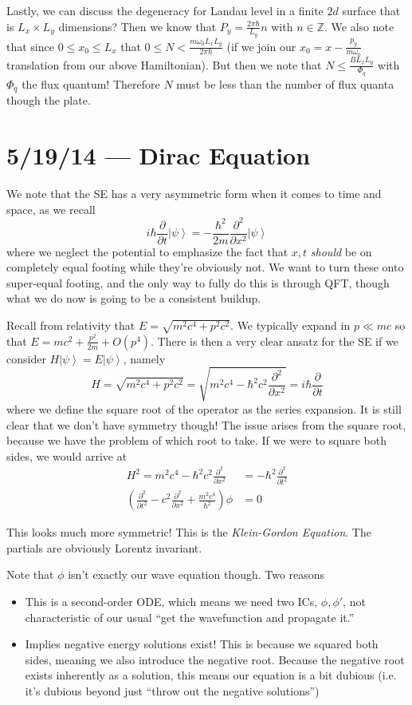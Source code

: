 \documentclass[10pt]{report}
\newcommand{\ket}[1]{\left|#1\right>}
\newcommand{\pd}[2]{\frac{\partial #1}{\partial#2}}
\newcommand{\ptd}[2]{\frac{\partial^2 #1}{\partial#2^2}}
\begin{document}
Lastly, we can discuss the degeneracy for Landau level in a finite $2d$ surface that is $L_x \times L_y$ dimensions? Then we know that $P_y= \frac{2\pi \hbar}{L_y}n$ with $n \in \mathbb{Z}$. We also note that since $0 \leq x_0 \leq L_x$ that $0 \leq N < \frac{m\omega_0 L_x L_y}{2\pi \hbar}$ (if we join our $x_0 = x - \frac{p_y}{m\omega_0}$ translation from our above Hamiltonian). But then we note that $N \leq \frac{BL_xL_y}{\Phi_{q}}$ with $\Phi_q$ the flux quantum! Therefore $N$ must be less than the number of flux quanta though the plate.
\chapter{5/19/14 --- Dirac Equation}

We note that the SE has a very asymmetric form when it comes to time and space, as we recall
\begin{equation}
    i\hbar \pd{}{t}\ket{\psi} = -\frac{\hbar^2}{2m} \ptd{}{x}\ket{\psi}
\end{equation}
where we neglect the potential to emphasize the fact that $x,t$ \emph{should} be on completely equal footing while they're obviously not. We want to turn these onto super-equal footing, and the only way to fully do this is through QFT, though what we do now is going to be a consistent buildup.

Recall from relativity that $E = \sqrt{m^2c^4 + p^2c^2}$. We typically expand in $p \ll mc$ so that $E = mc^2 + \frac{p^2}{2m} + O(p^4)$. There is then a very clear ansatz for the SE if we consider $H\ket{\psi} = E\ket{\psi}$, namely
\begin{equation}
    H = \sqrt{m^2c^4 + p^2c^2} = \sqrt{m^2c^4 - \hbar^2 c^2 \ptd{}{x}}= i\hbar \pd{}{t}
\end{equation}
where we define the square root of the operator as the series expansion. It is still clear that we don't have symmetry though! The issue arises from the square root, because we have the problem of which root to take. If we were to square both sides, we would arrive at
\begin{align}
    H^2 = m^2c^4 - \hbar^2c^2 \ptd{}{x} &= -\hbar^2 \ptd{}{t}\\
    \left(\ptd{}{t} - c^2\ptd{}{x} + \frac{m^2c^4}{\hbar^2}\right)\phi &= 0
\end{align}

This looks much more symmetric! This is the \emph{Klein-Gordon Equation}. The partials are obviously Lorentz invariant. 

Note that $\phi$ isn't exactly our wave equation though. Two reasons
\begin{itemize}
    \item This is a second-order ODE, which means we need two ICs, $\phi,\phi'$, not characteristic of our usual ``get the wavefunction and propagate it.''
    \item Implies negative energy solutions exist! This is because we squared both sides, meaning we also introduce the negative root. Because the negative root exists inherently as a solution, this means our equation is a bit dubious (i.e. it's dubious beyond just ``throw out the negative solutions'')
\end{itemize}
\end{document}
